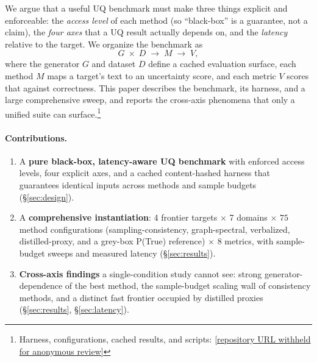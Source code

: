 \documentclass[11pt]{article}
\begin{document}
We argue that a useful UQ benchmark must make three things explicit and enforceable:
the \emph{access level} of each method (so ``black-box'' is a guarantee, not a claim),
the \emph{four axes} that a UQ result actually depends on, and the \emph{latency}
relative to the target. We organize the benchmark as
\[
  G \;\times\; D \;\longrightarrow\; M \;\longrightarrow\; V,
\]
where the generator $G$ and dataset $D$ define a cached evaluation surface, each method
$M$ maps a target's text to an uncertainty score, and each metric $V$ scores that against
correctness. This paper describes the benchmark, its harness, and a large comprehensive
sweep, and reports the cross-axis phenomena that only a unified suite can
surface.\footnote{Harness, configurations, cached results, and scripts:
\url{[repository URL withheld for anonymous review]}}

\paragraph{Contributions.}
\begin{enumerate}[leftmargin=1.4em,itemsep=1pt,topsep=2pt]
\item A \textbf{pure black-box, latency-aware UQ benchmark} with enforced access levels,
four explicit axes, and a cached content-hashed harness that guarantees identical inputs
across methods and sample budgets (\S\ref{sec:design}).
\item A \textbf{comprehensive instantiation}: 4 frontier targets $\times$ 7 domains
$\times$ $75$ method configurations (sampling-consistency, graph-spectral, verbalized,
distilled-proxy, and a grey-box P(True) reference) $\times$ 8 metrics, with sample-budget
sweeps and measured latency (\S\ref{sec:results}).
\item \textbf{Cross-axis findings} a single-condition study cannot see: strong
generator-dependence of the best method, the sample-budget scaling wall of
consistency methods, and a distinct fast frontier occupied by distilled proxies
(\S\ref{sec:results}, \S\ref{sec:latency}).
\end{enumerate}

\end{document}
